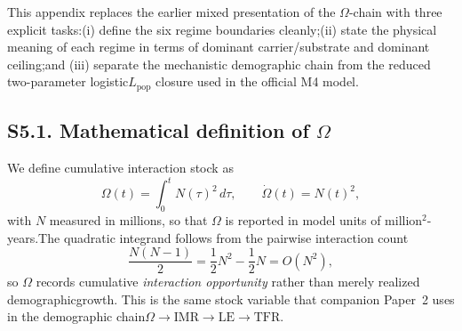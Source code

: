 \documentclass[11pt]{article}
\newcommand{\IMR}{\mathrm{IMR}}
\newcommand{\LE}{\mathrm{LE}}
\newcommand{\TFR}{\mathrm{TFR}}
\begin{document}
This appendix replaces the earlier mixed presentation of the $\Omega$-chain with three explicit tasks:(i) define the six regime boundaries cleanly;(ii) state the physical meaning of each regime in terms of dominant carrier/substrate and dominant ceiling;and (iii) separate the mechanistic demographic chain from the reduced two-parameter logistic$L_{\mathrm{pop}}$ closure used in the official M4 model.
\subsection*{S5.1. Mathematical definition of $\Omega$}\label{subsec:S5_definition}
We define cumulative interaction stock as
\begin{equation}\Omega(t)=\int_0^t N(\tau)^2\,d\tau,\qquad\dot\Omega(t)=N(t)^2,\tag{S5.1}\label{eq:S5_Omega_def}\end{equation}
with $N$ measured in millions, so that $\Omega$ is reported in model units of million$^2$-years.The quadratic integrand follows from the pairwise interaction count
\begin{equation}\frac{N(N-1)}{2}=\frac{1}{2}N^2-\frac{1}{2}N=O(N^2),\tag{S5.2}\label{eq:S5_pairwise}\end{equation}
so $\Omega$ records cumulative \emph{interaction opportunity} rather than merely realized demographicgrowth. This is the same stock variable that companion Paper~2 uses in the demographic chain$\Omega\rightarrow\IMR\rightarrow\LE\rightarrow\TFR$.
\end{document}
